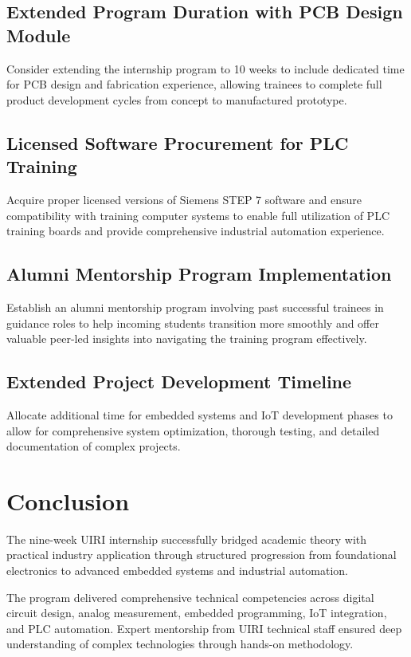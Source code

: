 \documentclass[12pt,a4paper]{report}
\begin{document}
\subsection{Extended Program Duration with PCB Design Module}
\noindent Consider extending the internship program to 10 weeks to include dedicated time for PCB design and fabrication experience, allowing trainees to complete full product development cycles from concept to manufactured prototype.

\subsection{Licensed Software Procurement for PLC Training}
\noindent Acquire proper licensed versions of Siemens STEP 7 software and ensure compatibility with training computer systems to enable full utilization of PLC training boards and provide comprehensive industrial automation experience.

\subsection{Alumni Mentorship Program Implementation}
\noindent Establish an alumni mentorship program involving past successful trainees in guidance roles to help incoming students transition more smoothly and offer valuable peer-led insights into navigating the training program effectively.

\subsection{Extended Project Development Timeline}
\noindent Allocate additional time for embedded systems and IoT development phases to allow for comprehensive system optimization, thorough testing, and detailed documentation of complex projects.

\newpage

\section{Conclusion}

\noindent The nine-week UIRI internship successfully bridged academic theory with practical industry application through structured progression from foundational electronics to advanced embedded systems and industrial automation.

\noindent The program delivered comprehensive technical competencies across digital circuit design, analog measurement, embedded programming, IoT integration, and PLC automation. Expert mentorship from UIRI technical staff ensured deep understanding of complex technologies through hands-on methodology.
\end{document}
